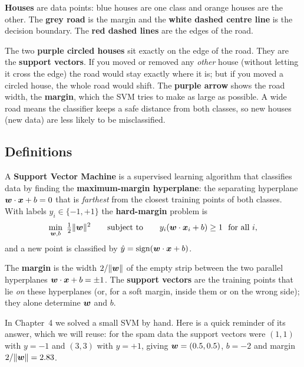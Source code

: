 \begin{explain}
\textbf{Houses} are data points: blue houses are one class and orange houses are the other. The \textbf{grey road} is the margin and the \textbf{white dashed centre line} is the decision boundary. The \textbf{red dashed lines} are the edges of the road.

\medskip
The two \textbf{purple circled houses} sit exactly on the edge of the road. They are the \textbf{support vectors}. If you moved or removed any \emph{other} house (without letting it cross the edge) the road would stay exactly where it is; but if you moved a circled house, the whole road would shift. The \textbf{purple arrow} shows the road width, the \textbf{margin}, which the SVM tries to make as large as possible. A wide road means the classifier keeps a safe distance from both classes, so new houses (new data) are less likely to be misclassified.
\end{explain}

\subsection{Definitions}

\begin{definition}
A \textbf{Support Vector Machine} is a supervised learning algorithm that classifies data by finding the \textbf{maximum-margin hyperplane}: the separating hyperplane $\boldsymbol{w}\cdot\boldsymbol{x}+b=0$ that is \emph{farthest} from the closest training points of both classes. With labels $y_i\in\{-1,+1\}$ the \textbf{hard-margin} problem is
\[
  \min_{\vect w,b}\ \tfrac12\|\vect w\|^2\qquad\text{subject to}\qquad y_i(\vect w\cdot\vect x_i+b)\ge1\ \ \text{for all }i,
\]
and a new point is classified by $\hat y=\operatorname{sign}(\boldsymbol{w}\cdot\boldsymbol{x}+b)$.
\end{definition}

\begin{definition}
The \textbf{margin} is the width $2/\|\boldsymbol{w}\|$ of the empty strip between the two parallel hyperplanes $\boldsymbol{w}\cdot\boldsymbol{x}+b=\pm1$. The \textbf{support vectors} are the training points that lie \emph{on} these hyperplanes (or, for a soft margin, inside them or on the wrong side); they alone determine $\boldsymbol{w}$ and $b$.
\end{definition}

In Chapter~4 we solved a small SVM by hand. Here is a quick reminder of its answer, which we will reuse: for the spam data the support vectors were $(1,1)$ with $y=-1$ and $(3,3)$ with $y=+1$, giving $\boldsymbol{w}=(0.5,0.5)$, $b=-2$ and margin $2/\|\boldsymbol{w}\|=2.83$.

